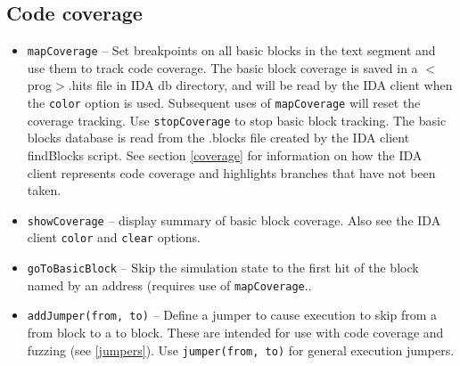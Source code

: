 \documentclass[titlepage]{article}
\begin{document}
\subsection{Code coverage}
\begin{itemize}
\item {\tt mapCoverage} -- Set breakpoints on all basic blocks in the text segment and use them to track code coverage. The basic block coverage is
saved in a $<$prog$>$.hits file in IDA db directory, and will be read by the IDA client when the {\tt color} option is used. Subsequent uses of {\tt mapCoverage}
will reset the coverage tracking.  Use {\tt stopCoverage} to stop basic block tracking.  The basic blocks database is read from the .blocks file created
by the IDA client findBlocks script.  See section \ref{coverage} for information on how the IDA client represents code coverage and highlights
branches that have not been taken.

\item {\tt showCoverage} -- display summary of basic block coverage.  Also see the IDA client {\tt color} and {\tt clear} options.

\item{\tt goToBasicBlock} -- Skip the simulation state to the first hit of the block named by an address (requires use of {\tt mapCoverage}..

\item{\tt addJumper(from, to)} -- Define a jumper to cause execution to skip from a from block to a to block.  These are intended for use with code coverage and fuzzing (see \ref{jumpers}).
Use {\tt jumper(from, to)} for general execution jumpers.
\end{itemize}
\end{document}
